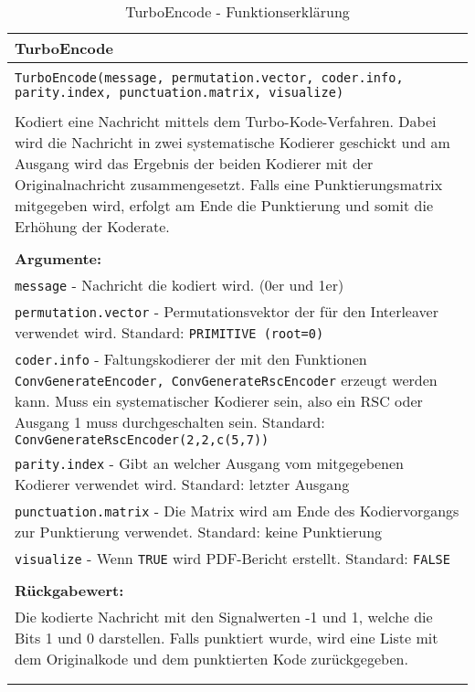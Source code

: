 \begin{longtable}{|p{\textwidth}|}
\hline
\rowcolor{lightblue}TurboEncode\\
\hline
\\
\texttt{TurboEncode(message, permutation.vector, coder.info, parity.index, punctuation.matrix, visualize)}\\
\\
Kodiert eine Nachricht mittels dem Turbo-Kode-Verfahren. Dabei wird die Nachricht in zwei systematische Kodierer geschickt und am Ausgang wird das Ergebnis der beiden Kodierer mit der Originalnachricht zusammengesetzt. Falls eine Punktierungsmatrix mitgegeben wird, erfolgt am Ende die Punktierung und somit die Erhöhung der Koderate.\\
\\
\textbf{Argumente:}\\
\texttt{message} - Nachricht die kodiert wird. (0er und 1er)\\
\texttt{permutation.vector} - Permutationsvektor der für den Interleaver verwendet wird. Standard: \texttt{PRIMITIVE (root=0)}\\
\texttt{coder.info} - Faltungskodierer der mit den Funktionen \texttt{ConvGenerateEncoder, ConvGenerateRscEncoder} erzeugt werden kann. Muss ein systematischer Kodierer sein, also ein RSC oder Ausgang 1 muss durchgeschalten sein. Standard: \texttt{ConvGenerateRscEncoder(2,2,c(5,7))}\\
\texttt{parity.index} - Gibt an welcher Ausgang vom mitgegebenen Kodierer verwendet wird. Standard: letzter Ausgang\\
\texttt{punctuation.matrix} - Die Matrix wird am Ende des Kodiervorgangs zur Punktierung verwendet. Standard: keine Punktierung\\
\texttt{visualize} - Wenn \texttt{TRUE} wird PDF-Bericht erstellt. Standard: \texttt{FALSE}\\
\\
\textbf{Rückgabewert:}\\
Die kodierte Nachricht mit den Signalwerten -1 und 1, welche die Bits 1 und 0 darstellen. Falls punktiert wurde, wird eine Liste mit dem Originalkode und dem punktierten Kode zurückgegeben.\\
\\
\hline
\caption[TurboEncode]{TurboEncode - Funktionserklärung}
\end{longtable}